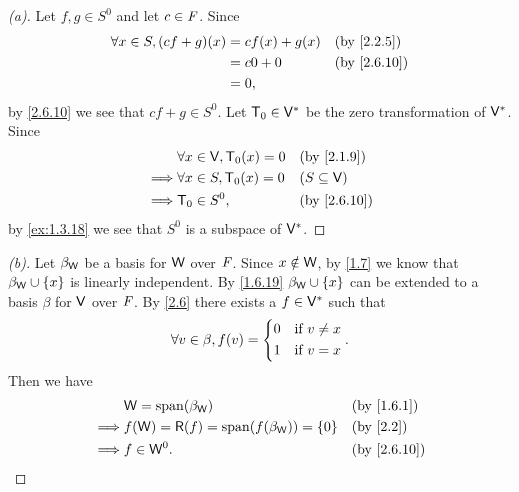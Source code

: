\begin{proof}[(a)]
	Let \(f, g \in S^0\) and let \(c \in \mathit{F}\).
	Since
	\begin{align*}
		\forall x \in S, (cf + g)(x) & = cf(x) + g(x) &  & \by{2.2.5}  \\
		                             & = c0 + 0       &  & \by{2.6.10} \\
		                             & = 0,
	\end{align*}
	by \cref{2.6.10} we see that \(cf + g \in S^0\).
	Let \(\mathsf{T}_0 \in \mathsf{V}^*\) be the zero transformation of \(\mathsf{V}^*\).
	Since
	\begin{align*}
		         & \forall x \in \V, \zT(x) = 0 &  & \by{2.1.9}       \\
		\implies & \forall x \in S, \zT(x) = 0  &  & (S \subseteq \V) \\
		\implies & \zT \in S^0,                 &  & \by{2.6.10}
	\end{align*}
	by \cref{ex:1.3.18} we see that \(S^0\) is a subspace of \(\mathsf{V}^*\).
\end{proof}

\begin{proof}[(b)]
	Let \(\beta_{\mathsf{W}}\) be a basis for \(\mathsf{W}\) over \(\mathit{F}\).
	Since \(x \notin \mathsf{W}\), by \cref{1.7} we know that \(\beta_{\mathsf{W}} \cup \left\lbrace x\right\rbrace\) is linearly independent.
	By \cref{1.6.19} \(\beta_{\mathsf{W}} \cup \left\lbrace x\right\rbrace\) can be extended to a basis \(\beta\) for \(\mathsf{V}\) over \(\mathit{F}\).
	By \cref{2.6} there exists a \(f \in \mathsf{V}^*\) such that
	\[
		\forall v \in \beta, f(v) = \begin{dcases}
			0 & \text{if } v \neq x \\
			1 & \text{if } v = x
		\end{dcases}.
	\]
	Then we have
	\begin{align*}
		         & \W = \spn{\beta_{\W}}                          &  & \by{1.6.1}  \\
		\implies & f(\W) = \rg{f} = \spn{f(\beta_{\W})} = \set{0} &  & \by{2.2}    \\
		\implies & f \in \W^0.                                    &  & \by{2.6.10}
	\end{align*}
\end{proof}

